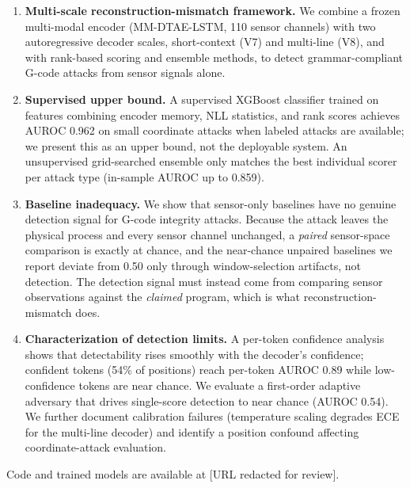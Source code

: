 \begin{enumerate}
    \item \textbf{Multi-scale reconstruction-mismatch framework.} We combine a frozen multi-modal encoder (MM-DTAE-LSTM, 110 sensor channels) with two autoregressive decoder scales, short-context (V7) and multi-line (V8), and with rank-based scoring and ensemble methods, to detect grammar-compliant G-code attacks from sensor signals alone.

    \item \textbf{Supervised upper bound.} A supervised XGBoost classifier trained on features combining encoder memory, NLL statistics, and rank scores achieves AUROC 0.962 on small coordinate attacks when labeled attacks are available; we present this as an upper bound, not the deployable system. An unsupervised grid-searched ensemble only matches the best individual scorer per attack type (in-sample AUROC up to 0.859).

    \item \textbf{Baseline inadequacy.} We show that sensor-only baselines have no genuine detection signal for G-code integrity attacks. Because the attack leaves the physical process and every sensor channel unchanged, a \emph{paired} sensor-space comparison is exactly at chance, and the near-chance unpaired baselines we report deviate from 0.50 only through window-selection artifacts, not detection. The detection signal must instead come from comparing sensor observations against the \emph{claimed} program, which is what reconstruction-mismatch does.

    \item \textbf{Characterization of detection limits.} A per-token confidence analysis shows that detectability rises smoothly with the decoder's confidence; confident tokens (54\% of positions) reach per-token AUROC 0.89 while low-confidence tokens are near chance. We evaluate a first-order adaptive adversary that drives single-score detection to near chance (AUROC 0.54). We further document calibration failures (temperature scaling degrades ECE for the multi-line decoder) and identify a position confound affecting coordinate-attack evaluation.
\end{enumerate}

Code and trained models are available at [URL redacted for review].

